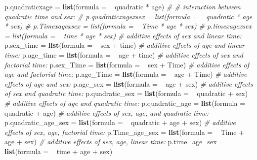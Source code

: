 \documentclass[]{article}
\newenvironment{Shaded}{\begin{snugshade}}{\end{snugshade}}
\newcommand{\KeywordTok}[1]{\textcolor[rgb]{0.13,0.29,0.53}{\textbf{{#1}}}}
\newcommand{\DataTypeTok}[1]{\textcolor[rgb]{0.13,0.29,0.53}{{#1}}}
\newcommand{\StringTok}[1]{\textcolor[rgb]{0.31,0.60,0.02}{{#1}}}
\newcommand{\CommentTok}[1]{\textcolor[rgb]{0.56,0.35,0.01}{\textit{{#1}}}}
\newcommand{\NormalTok}[1]{{#1}}
\begin{document}
\begin{Shaded}
\begin{Highlighting}[]
    \NormalTok{p.quadraticxage =}\StringTok{ }\KeywordTok{list}\NormalTok{(}\DataTypeTok{formula =}  \NormalTok{~}\StringTok{ }\NormalTok{quadratic *}\StringTok{ }\NormalTok{age)}
    \CommentTok{# # interaction between quadratic time and sex:}
    \CommentTok{# p.quadraticxagexsex = list(formula =  ~ quadratic * age * sex)}
    \CommentTok{# p.Timexagexsex = list(formula =  ~ Time * age * sex)}
    \CommentTok{# p.timexagexsex = list(formula =  ~ time * age * sex)}
    \CommentTok{# additive effects of sex and linear time:}
    \NormalTok{p.sex_time =}\StringTok{ }\KeywordTok{list}\NormalTok{(}\DataTypeTok{formula =}  \NormalTok{~}\StringTok{ }\NormalTok{sex +}\StringTok{ }\NormalTok{time)}
    \CommentTok{# additive effects of age and linear time:}
    \NormalTok{p.age_time =}\StringTok{ }\KeywordTok{list}\NormalTok{(}\DataTypeTok{formula =}  \NormalTok{~}\StringTok{ }\NormalTok{age +}\StringTok{ }\NormalTok{time)}
    \CommentTok{# additive effects of sex and factorial time:}
    \NormalTok{p.sex_Time =}\StringTok{ }\KeywordTok{list}\NormalTok{(}\DataTypeTok{formula =}  \NormalTok{~}\StringTok{ }\NormalTok{sex +}\StringTok{ }\NormalTok{Time)}
    \CommentTok{# additive effects of age and factorial time:}
    \NormalTok{p.age_Time =}\StringTok{ }\KeywordTok{list}\NormalTok{(}\DataTypeTok{formula =}  \NormalTok{~}\StringTok{ }\NormalTok{age +}\StringTok{ }\NormalTok{Time)}
    \CommentTok{# additive effects of age and sex:}
    \NormalTok{p.age_sex =}\StringTok{ }\KeywordTok{list}\NormalTok{(}\DataTypeTok{formula =}  \NormalTok{~}\StringTok{ }\NormalTok{age +}\StringTok{ }\NormalTok{sex)}
    \CommentTok{# additive effects of sex and quadratic time:}
    \NormalTok{p.quadratic_sex =}\StringTok{ }\KeywordTok{list}\NormalTok{(}\DataTypeTok{formula =}  \NormalTok{~}\StringTok{ }\NormalTok{quadratic +}\StringTok{ }\NormalTok{sex)}
    \CommentTok{# additive effects of age and quadratic time:}
    \NormalTok{p.quadratic_age =}\StringTok{ }\KeywordTok{list}\NormalTok{(}\DataTypeTok{formula =}  \NormalTok{~}\StringTok{ }\NormalTok{quadratic +}\StringTok{ }\NormalTok{age)}
    \CommentTok{# additive effects of sex, age, and quadratic time:}
    \NormalTok{p.quadratic_age_sex =}\StringTok{ }\KeywordTok{list}\NormalTok{(}\DataTypeTok{formula =}  \NormalTok{~}\StringTok{ }\NormalTok{quadratic +}\StringTok{ }\NormalTok{age +}\StringTok{ }\NormalTok{sex)}
    \CommentTok{# additive effects of sex, age, factorial time:}
    \NormalTok{p.Time_age_sex =}\StringTok{ }\KeywordTok{list}\NormalTok{(}\DataTypeTok{formula =}  \NormalTok{~}\StringTok{ }\NormalTok{Time +}\StringTok{ }\NormalTok{age +}\StringTok{ }\NormalTok{sex)}
    \CommentTok{# additive effects of sex, age, linear time:}
    \NormalTok{p.time_age_sex =}\StringTok{ }\KeywordTok{list}\NormalTok{(}\DataTypeTok{formula =}  \NormalTok{~}\StringTok{ }\NormalTok{time +}\StringTok{ }\NormalTok{age +}\StringTok{ }\NormalTok{sex)}
    

\end{Highlighting}
\end{Shaded}
\end{document}
